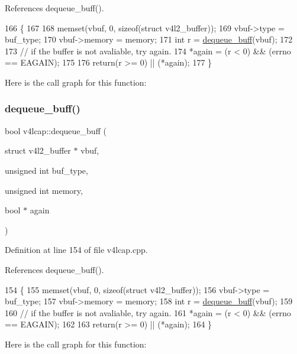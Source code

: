 References dequeue\+\_\+buff().


\begin{DoxyCode}
166                                                                                                            
                  \{
167 
168     memset(vbuf, 0, \textcolor{keyword}{sizeof}(\textcolor{keyword}{struct} v4l2\_buffer));
169     vbuf->type = buf\_type;
170     vbuf->memory = memory;
171     \textcolor{keywordtype}{int} r = \hyperlink{classv4lcap_a73678c131c1ac6c555be3ea125be08da}{dequeue\_buff}(vbuf);
172 
173     \textcolor{comment}{// if the buffer is not avaliable, try again.}
174     *again = (r < 0) && (errno == EAGAIN);
175 
176     \textcolor{keywordflow}{return}(r >= 0) || (*again);
177 \}
\end{DoxyCode}
Here is the call graph for this function\+:
\mbox{\label{classv4lcap_a8968da9e151ee6048cb179e62d3b088f}} 
\subsubsection{\texorpdfstring{dequeue\+\_\+buff()}{dequeue\_buff()}\hspace{0.1cm}{\footnotesize\ttfamily [3/3]}}
{\footnotesize\ttfamily bool v4lcap\+::dequeue\+\_\+buff (\begin{DoxyParamCaption}\item[{struct v4l2\+\_\+buffer $\ast$}]{vbuf,  }\item[{unsigned int}]{buf\+\_\+type,  }\item[{unsigned int}]{memory,  }\item[{bool $\ast$}]{again }\end{DoxyParamCaption})}



Definition at line 154 of file v4lcap.\+cpp.



References dequeue\+\_\+buff().


\begin{DoxyCode}
154                                                                                                            
        \{
155     memset(vbuf, 0, \textcolor{keyword}{sizeof}(\textcolor{keyword}{struct} v4l2\_buffer));
156     vbuf->type = buf\_type;
157     vbuf->memory = memory;
158     \textcolor{keywordtype}{int} r = \hyperlink{classv4lcap_a73678c131c1ac6c555be3ea125be08da}{dequeue\_buff}(vbuf);
159 
160     \textcolor{comment}{// if the buffer is not avaliable, try again.}
161     *again = (r < 0) && (errno == EAGAIN);
162 
163     \textcolor{keywordflow}{return}(r >= 0) || (*again);
164 \}
\end{DoxyCode}
Here is the call graph for this function\+:
\mbox{\label{classv4lcap_a61dcacb5bb57a9f8c72d6942f46e9ddc}} 
